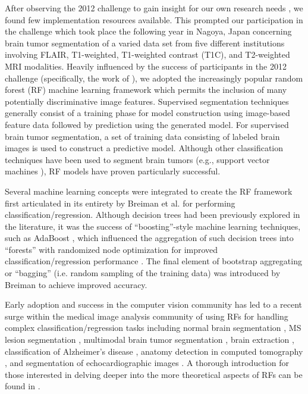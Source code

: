 \documentclass[preprint,authoryear,review,12pt]{elsarticle}
\begin{document}
After observing the 2012 challenge to gain insight for our own research 
needs \citep{durst2014}, we found few implementation resources available.
  This prompted our participation in the challenge which took place
the following year in Nagoya, Japan concerning brain tumor segmentation
of a varied data set from five different institutions involving FLAIR, 
T1-weighted, T1-weighted contrast (T1C), and T2-weighted MRI modalities.  Heavily influenced by the success 
of participants in the 2012 challenge (specifically, the work of 
\cite{bauer2012,geremia2012,zikic2012}), we adopted the increasingly popular 
random forest (RF) machine learning framework \citep{breiman2001} which 
permits the inclusion of many potentially discriminative image features.  
Supervised segmentation techniques generally consist of a training phase
for model construction using image-based feature data followed by prediction using the 
generated model.  For supervised brain tumor segmentation, 
a set of training data consisting of labeled brain images 
is used to construct a predictive model.  Although other 
classification techniques have been used to segment
brain tumors (e.g., support vector machines \citep{bauer2011}),
RF models have proven particularly successful.

Several machine learning concepts were integrated to create 
the RF framework first articulated in its entirety by Breiman
et al. \citep{breiman2001} for performing classification/regression.  
Although decision trees had been previously explored in the literature, 
it was the success of ``boosting''-style machine learning 
techniques, such as AdaBoost \citep{schapire1990,freund1997}, which influenced 
the aggregation of such decision trees into ``forests'' 
with randomized node optimization for improved
classification/regression performance \citep{ho1995,amit1997}.
The final element of bootstrap aggregating or ``bagging'' (i.e.
random sampling of the training data) was
introduced by Breiman \citep{breiman1996} to achieve improved
accuracy.%

Early adoption \citep{viola2005} and success in the
computer vision community
has led to a recent surge within the medical image analysis
community of using RFs for handling complex 
classification/regression tasks including
normal brain segmentation \citep{yi2009},
MS lesion segmentation \cite{geremia2011}, 
multimodal brain tumor segmentation
\citep{bauer2012,zikic2012}, brain extraction \citep{iglesias2010}, 
classification of Alzheimer's disease \citep{gray2013},
anatomy detection in computed tomography \citep{criminisi2013}, and
segmentation of echocardiographic images \citep{verhoek2011}. 
A thorough introduction for those interested in delving deeper 
into the more theoretical aspects of RFs can be found
in \cite{criminisi2011}.
\end{document}
